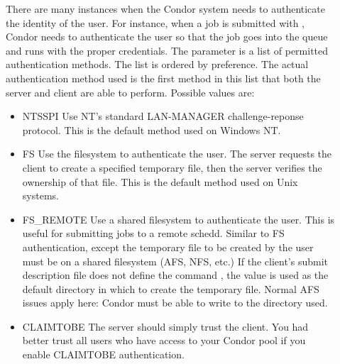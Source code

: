 \begin{description}
\item[]\label{param:AuthenticationMethods}
  There are many instances when the Condor system needs to authenticate
  the identity of the user.  For instance, when a job is submitted with
  , Condor needs to authenticate the user so that the job
  goes into the queue and runs with the proper credentials.  The
   parameter is a list of
  permitted authentication methods.  The list is ordered by
  preference.  The actual authentication method used is the first method
  in this list that both the server and client are able to perform.
  Possible values are:
  \begin{itemize}
	\item NTSSPI Use NT's standard LAN-MANAGER challenge-reponse protocol.
	\Note This is the default method used on Windows NT.
	\item FS Use the filesystem to authenticate the user.  
		The server requests the client to create a specified temporary
		file, then the server verifies the ownership of that file. \Note
		This is the default method used on Unix systems.
	\item FS\_REMOTE Use a shared filesystem to authenticate the user.
		This is useful for submitting jobs to a remote schedd.
		Similar to FS authentication, except the temporary file to be
		created by the user must be on a shared filesystem (AFS, NFS, etc.)
		If the client's submit description file does not define the 
		command , the  value is used 
		as the default directory in which to create the temporary file.
		\Note Normal AFS issues apply here: Condor must be able to write
		to the directory used.
	\item CLAIMTOBE The server should simply trust the client.  
		\Note You had better trust all users who have access to your Condor
		pool if you enable CLAIMTOBE authentication.
  \end{itemize}


\end{description}
